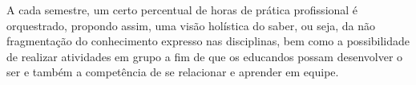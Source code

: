 \documentclass[
	12pt,				%
	openright,			%
	twoside,			%
	a4paper,			%
	chapter=TITLE,		%
	english,			%
	french,				%
	spanish,			%
	brazil,				%
	]{abntex2}
\begin{document}
A cada semestre, um certo percentual de horas de prática profissional é orquestrado, propondo assim, uma visão holística do saber, ou seja, da não fragmentação do conhecimento expresso nas disciplinas, bem como a possibilidade de realizar atividades em grupo a fim de que os educandos possam desenvolver o ser e também a competência de se relacionar e aprender em equipe.
\begin{landscape}
\newcommand{\ccel}[1]{\multicolumn{1}{c}{#1}}

\begin{quadro}[h]
\end{quadro}
\end{landscape}
\end{document}
